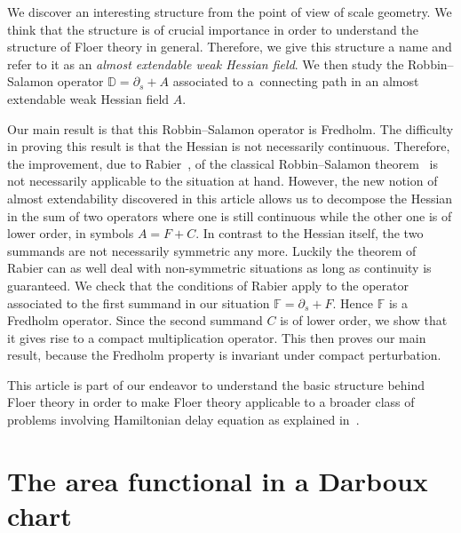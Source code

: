 \documentclass[pdftex]{sigma}
\numberwithin{equation}{section}
\newcommand{\D}{{\mathbb{D}}}
\newcommand{\F}{{\mathbb{F}}}
\newcommand{\p}{{\partial}}
\newcommand{\1}{{{\mathchoice {\rm 1\mskip-4mu l} {\rm 1\mskip-4mu l}
{\rm 1\mskip-4.5mu l} {\rm 1\mskip-5mu l}}}}
\begin{document}
We discover an interesting structure from the point of view of scale
geometry. We think that the structure is of crucial importance in
order to understand the structure of Floer theory in general.
Therefore, we give this structure a name and refer to it as
an \emph{almost extendable weak Hessian field}.
We then study the Robbin--Salamon operator
$\D=\p_s +A$
associated to a~connecting path in an almost extendable weak Hessian
field $A$.

Our main result is that this Robbin--Salamon operator is Fredholm.
The difficulty in proving this result is that
the Hessian is not necessarily continuous.
Therefore, the improvement, due to Rabier~\cite{Rabier:2004a}, of the classical
Robbin--Salamon theorem~\cite{robbin:1995a} is not necessarily
applicable to the situation at hand.
However, the new notion of almost extendability discovered in this article
allows us to decompose the Hessian in the sum of two operators
where one is still continuous while the other one is of lower order,
in symbols
$A=F+C$.
In contrast to the Hessian itself, the two summands are not necessarily
symmetric any more.
Luckily the theorem of Rabier can as well deal with non-symmetric
situations as long as continuity is guaranteed.
We check that the conditions of Rabier apply to the operator
associated to the first summand in our situation
$\F=\p_s +F$.
Hence $\F$ is a Fredholm operator.
Since the second summand $C$ is of lower order, we show that it
gives rise to a compact multiplication operator. This then proves our
main result, because the Fredholm property is invariant under compact
perturbation.

This article is part of our endeavor to understand the basic structure
behind Floer theory
in order to make Floer theory applicable to a broader class of
problems involving Hamiltonian delay equation
as explained in~\cite{Frauenfelder:2024c,Frauenfelder:2024d}.

\section{The area functional in a Darboux chart}
\end{document}
